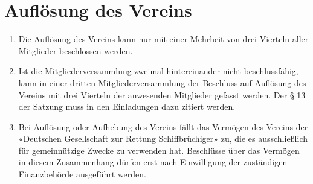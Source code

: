 \documentclass[10pt, twocolumn, parskip=half]{scrartcl}
\begin{document}
\section{Auflösung des Vereins}
\begin{enumerate}[noitemsep]
	\item  Die Auflösung des Vereins kann nur mit einer Mehrheit von drei Vierteln aller Mitglieder beschlossen werden.
	\item Ist die Mitgliederversammlung zweimal hintereinander nicht beschlussfähig, kann in einer dritten Mitgliederversammlung der Beschluss auf Auflösung des Vereins mit drei Vierteln der anwesenden Mitglieder gefasst werden. Der § 13 der Satzung muss in den Einladungen dazu zitiert werden.
	\item Bei Auflösung oder Aufhebung des Vereins fällt das Vermögen des Vereins der «Deutschen Gesellschaft zur Rettung Schiffbrüchiger» zu, die es ausschließlich für gemeinnützige Zwecke zu verwenden hat. Beschlüsse über das Vermögen in diesem Zusammenhang dürfen erst nach Einwilligung der zuständigen Finanzbehörde ausgeführt werden.
\end{enumerate}
\end{document}
